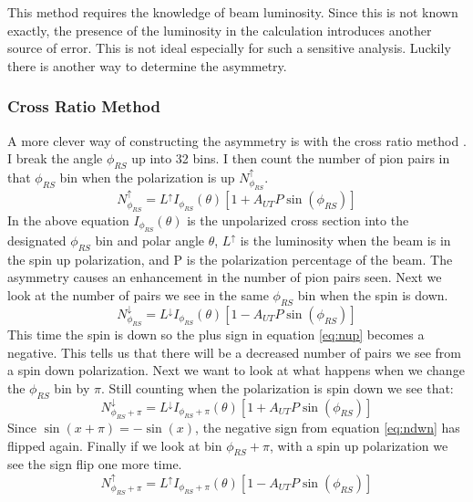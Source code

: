 \documentclass[abstract = on,listof=totoc, bibliography=totoc]{scrreprt}
\begin{document}
This method requires the knowledge of beam luminosity. Since this is not known exactly, the presence of the luminosity in the calculation introduces another source of error. This is not ideal especially for such a sensitive analysis. Luckily there is another way to determine the asymmetry.   

\subsubsection{Cross Ratio Method}

A more clever way of constructing the asymmetry is with the cross ratio method \cite{crossRatio}. I break the angle $\phi_{RS}$ up into 32 bins. I then count the number of pion pairs in that $\phi_{RS}$ bin when the polarization is up $N^\uparrow_{\phi_{RS}}$. 
\begin{equation}
\label{eq:nup}
N^\uparrow_{\phi_{RS}} = L^\uparrow I_{\phi_{RS}}(\theta)\left[1+A_{UT}P\sin(\phi_{RS})\right]
\end{equation}
In the above equation $I_{\phi_{RS}}(\theta)$ is the unpolarized cross section into the designated $\phi_{RS}$ bin and polar angle $\theta$, $L^\uparrow$ is the luminosity when the beam is in the spin up polarization, and P is the polarization percentage of the beam. The asymmetry causes an enhancement in the number of pion pairs seen. Next we look at the number of pairs we see in the same $\phi_{RS}$ bin when the spin is down.
\begin{equation}
\label{eq:ndwn}
N^\downarrow_{\phi_{RS}} = L^\downarrow I_{\phi_{RS}}(\theta)\left[1-A_{UT}P\sin(\phi_{RS})\right]
\end{equation}
This time the spin is down so the plus sign in equation \ref{eq:nup} becomes a negative. This tells us that there will be a decreased number of pairs we see from a spin down polarization. 
Next we want to look at what happens when we change the $\phi_{RS}$ bin by $\pi$. Still counting when the polarization is spin down we see that:
\begin{equation}
\label{eq:ndwnphi}
N^\downarrow_{\phi_{RS}+\pi} = L^\downarrow I_{\phi_{RS}+\pi}(\theta)\left[1+A_{UT}P\sin(\phi_{RS})\right]
\end{equation}
Since $\sin(x+\pi) = -\sin(x)$, the negative sign from equation \ref{eq:ndwn} has flipped again. Finally if we look at bin $\phi_{RS} + \pi$, with a spin up polarization we see the sign flip one more time. 
\begin{equation}
\label{eq:nupphi}
N^\uparrow_{\phi_{RS}+\pi} = L^\uparrow I_{\phi_{RS}+\pi}(\theta)\left[1-A_{UT}P\sin(\phi_{RS})\right]
\end{equation}
\end{document}
